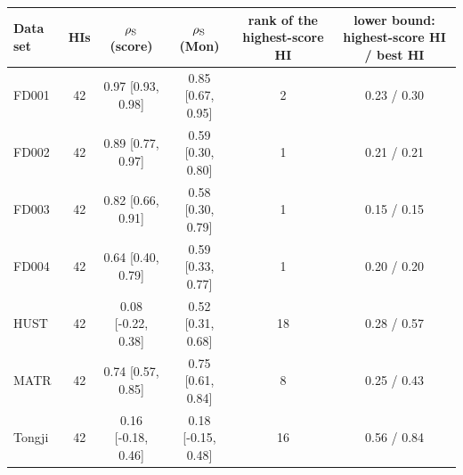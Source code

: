 \begin{tabular}{l c c c c c}
\hline
Data set & HIs & $\rho_{\rm S}$ (score) & $\rho_{\rm S}$ (Mon) & rank of the highest-score HI & lower bound: highest-score HI / best HI \\
\hline
FD001 & 42 & 0.97 [0.93, 0.98] & 0.85 [0.67, 0.95] & 2 & 0.23 / 0.30 \\
FD002 & 42 & 0.89 [0.77, 0.97] & 0.59 [0.30, 0.80] & 1 & 0.21 / 0.21 \\
FD003 & 42 & 0.82 [0.66, 0.91] & 0.58 [0.30, 0.79] & 1 & 0.15 / 0.15 \\
FD004 & 42 & 0.64 [0.40, 0.79] & 0.59 [0.33, 0.77] & 1 & 0.20 / 0.20 \\
HUST & 42 & 0.08 [-0.22, 0.38] & 0.52 [0.31, 0.68] & 18 & 0.28 / 0.57 \\
MATR & 42 & 0.74 [0.57, 0.85] & 0.75 [0.61, 0.84] & 8 & 0.25 / 0.43 \\
Tongji & 42 & 0.16 [-0.18, 0.46] & 0.18 [-0.15, 0.48] & 16 & 0.56 / 0.84 \\
\hline
\end{tabular}
